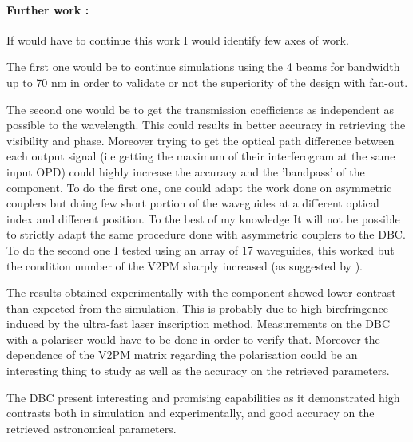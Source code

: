\paragraph{Further work :}
If would have to continue this work I would identify few axes of work.

The first one would be to continue simulations using the 4 beams for bandwidth up to 70 nm in order to validate or not the superiority of the design with fan-out.

The second one would be to get the transmission coefficients as independent as possible to the wavelength. This could results in better accuracy in retrieving the visibility and phase. Moreover trying to get the optical path difference between each output signal (i.e getting the maximum of their interferogram at the same input OPD) could highly increase the accuracy and the 'bandpass' of the component. 
To do the first one, one could adapt the work done on asymmetric couplers but doing few short portion of the waveguides at a different optical index and different position. To the best of my knowledge It will not be possible to strictly adapt the same procedure done with asymmetric couplers to the DBC.
To do the second one I tested using an array of 17 waveguides, this worked but the condition number of the V2PM sharply increased (as suggested by \cite{minardi1}). 

The results obtained experimentally with the component showed lower contrast than expected from the simulation. This is probably due to high birefringence induced by the ultra-fast laser inscription method. Measurements on the DBC with a polariser would have to be done in order to verify that. Moreover the dependence of the V2PM matrix regarding the polarisation could be an interesting thing to study as well as the accuracy on the retrieved parameters.

The DBC present interesting and promising capabilities as it demonstrated high contrasts both in simulation and experimentally, and good accuracy on the retrieved astronomical parameters. 